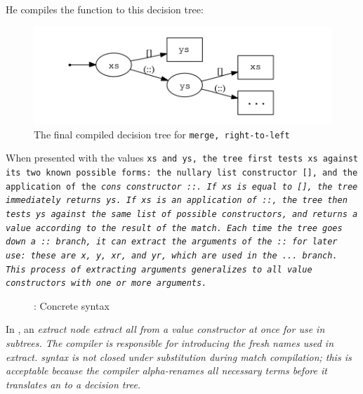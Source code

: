 \documentclass[manuscript,screen,review, 12pt, nonacm]{acmart}
\begin{document}
  He compiles the function to this decision tree: 

  \begin{figure}[H]
      \includegraphics[scale=0.7]{../images/dtree.png}
      \caption{The final compiled decision tree for \tt{merge}, right-to-left}
  \end{figure}

  When presented with the values \tt{xs} and \tt{ys}, the tree first tests
  \tt{xs} against its two known possible forms: the nullary list constructor
  \tt{[]}, and the application of the \it{cons} constructor \tt{::}. If
  \tt{xs} is equal to \tt{[]}, the tree immediately returns \tt{ys}. If
  \tt{xs} is an application of \tt{::}, the tree then tests \tt{ys} against
  the same list of possible constructors, and returns a value according to the
  result of the match. Each time the tree goes down a \tt{::} branch, it can
  extract the arguments of the \tt{::} for later use: these are \tt{x},
  \tt{y}, \tt{xr}, and \tt{yr}, which are used in the \tt{...} branch. This
  process of extracting arguments generalizes to all value constructors with
  one or more arguments. 

  \begin{figure}
    \begin{center}
    \dcsyntax
    \end{center}
    \caption{\D: Concrete syntax}
    \label{fig:dsyntax}
    \end{figure}



  In \D, an \it{extract} node extract all from a value constructor at once for
  use in subtrees. The compiler is responsible for introducing the fresh names
  used in \it{extract}. \VMinus syntax is not closed under substitution during 
  match compilation; this is acceptable because the compiler alpha-renames all
  necessary terms before it translates an \iffibf to a decision tree. 
\end{document}
